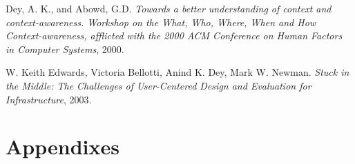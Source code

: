 \documentclass[]{report}
\begin{document}
\begin{thebibliography}{9}

  Dey, A. K., and Abowd, G.D.
  \emph{Towards a better understanding of context and context-awareness. Workshop on the What, Who, Where, When and How Context-awareness, afflicted with the 2000 ACM Conference on Human Factors in Computer Systems},
  2000.
  
  W. Keith Edwards, Victoria Bellotti, Anind K. Dey,
  Mark W. Newman.
  \emph{Stuck in the Middle: The Challenges of
  User-Centered Design and Evaluation for Infrastructure},
  2003.

\end{thebibliography}
\chapter{Appendixes}
\end{document}
